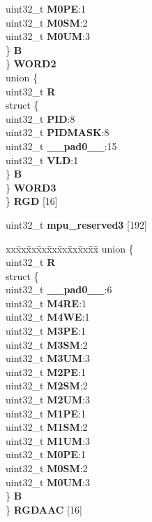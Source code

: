 \begin{DoxyCompactItemize}
\begin{tabbing}
\>\>\>uint32\_t {\bfseries M0PE}:1\\
\>\>\>uint32\_t {\bfseries M0SM}:2\\
\>\>\>uint32\_t {\bfseries M0UM}:3\\
\>\>\} {\bfseries B}\\
\>\} {\bfseries WORD2}\\
\>union \{\\
\>\>uint32\_t {\bfseries R}\\
\>\>struct \{\\
\>\>\>uint32\_t {\bfseries PID}:8\\
\>\>\>uint32\_t {\bfseries PIDMASK}:8\\
\>\>\>uint32\_t {\bfseries \_\_pad0\_\_}:15\\
\>\>\>uint32\_t {\bfseries VLD}:1\\
\>\>\} {\bfseries B}\\
\>\} {\bfseries WORD3}\\
\} {\bfseries RGD} \mbox{[}16\mbox{]}\\

\end{tabbing}\item 
\mbox{\label{structMPU__tag_ab7a644c3576d4eb5ba7ce358c2c1b2af}} 
uint32\+\_\+t {\bfseries mpu\+\_\+reserved3} \mbox{[}192\mbox{]}
\item 
\mbox{\label{structMPU__tag_a60145f661c531bf017aa718e0bb06532}} 
\begin{tabbing}
xx\=xx\=xx\=xx\=xx\=xx\=xx\=xx\=xx\=\kill
union \{\\
\>uint32\_t {\bfseries R}\\
\>struct \{\\
\>\>uint32\_t {\bfseries \_\_pad0\_\_}:6\\
\>\>uint32\_t {\bfseries M4RE}:1\\
\>\>uint32\_t {\bfseries M4WE}:1\\
\>\>uint32\_t {\bfseries M3PE}:1\\
\>\>uint32\_t {\bfseries M3SM}:2\\
\>\>uint32\_t {\bfseries M3UM}:3\\
\>\>uint32\_t {\bfseries M2PE}:1\\
\>\>uint32\_t {\bfseries M2SM}:2\\
\>\>uint32\_t {\bfseries M2UM}:3\\
\>\>uint32\_t {\bfseries M1PE}:1\\
\>\>uint32\_t {\bfseries M1SM}:2\\
\>\>uint32\_t {\bfseries M1UM}:3\\
\>\>uint32\_t {\bfseries M0PE}:1\\
\>\>uint32\_t {\bfseries M0SM}:2\\
\>\>uint32\_t {\bfseries M0UM}:3\\
\>\} {\bfseries B}\\
\} {\bfseries RGDAAC} \mbox{[}16\mbox{]}\\


\end{tabbing}
\end{DoxyCompactItemize}

